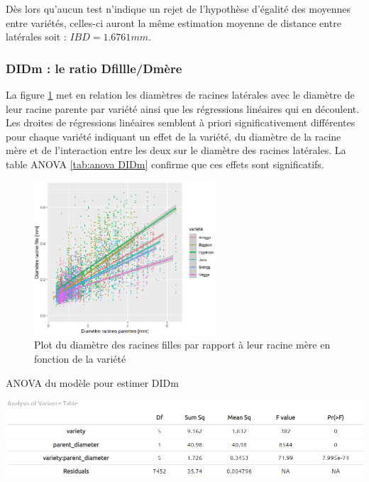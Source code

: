 Dès lors qu'aucun test n'indique un rejet de l'hypothèse d'égalité des moyennes entre variétés, celles-ci auront la même estimation moyenne de distance entre latérales soit : $IBD=1.6761 mm$.

\subsubsection{DIDm : le ratio Dfillle/Dmère}

La figure \ref{fig:plot DIDm} met en relation les diamètres de racines latérales avec le diamètre de leur racine parente par variété ainsi que les régressions linéaires qui en découlent.
Les droites de régressions linéaires semblent à priori significativement différentes pour chaque variété indiquant un effet de la variété, du diamètre de la racine mère et de l'interaction entre les deux sur le diamètre des racines latérales.
La table ANOVA \ref{tab:anova DIDm} confirme que ces effets sont significatifs.
\newpage

\begin{figure}[ht]
\centering
\includegraphics[width=0.6\textwidth]{Image/plot DIDm.png}
\caption{Plot du diamètre des racines filles par rapport à leur racine mère en fonction de la variété}
\label{fig:plot DIDm}
\end{figure}

\begin{table}[ht]
    \centering
    \caption{ANOVA du modèle pour estimer DIDm}
    \includegraphics[width=1\textwidth]{Image/anova DIDm.png}
    \label{tab:anova DIDm}
\end{table}

